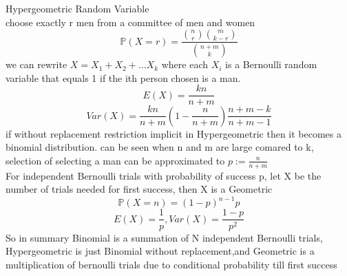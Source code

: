 \documentclass{article}
\begin{document}
Hypergeometric Random Variable \\
choose exactly r men from a committee of men and women
$$
\mathbb{P}(X=r)=\frac{{n \choose r}{m \choose k-r}}{{n+m \choose k}}
$$
we can rewrite  $X=X_1+X_2+...X_k$
where each $X_i$ is a Bernoulli random variable that equals 1 if the ith person chosen is a man.
$$
E(X)=\frac{kn}{n+m}
$$
$$
Var(X)=\frac{kn}{n+m}(1-\frac{n}{n+m})\frac{n+m-k}{n+m-1}
$$
if without replacement restriction implicit in Hypergeometric then it becomes a binomial distribution. can be seen when n and m are large comared to k, selection of selecting a man can be approximated to $p:=\frac{n}{n+m}$\\
For independent Bernoulli trials with probability of success p, let X be the number of trials needed for first success, then X is a Geometric
$$
\mathbb P(X=n)=(1-p)^{n-1}p
$$
$$
E(X)=\frac{1}{p}, Var(X)=\frac{1-p}{p^2}
$$
So in summary Binomial is a summation of N independent Bernoulli trials, Hypergeometric is just Binomial without replacement,and Geometric is a multiplication of bernoulli trials due to conditional probability till first success
\end{document}

